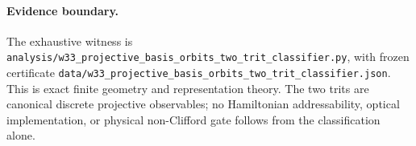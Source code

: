 \paragraph{Evidence boundary.}
The exhaustive witness is
\texttt{analysis/w33\_projective\_basis\_orbits\_two\_trit\_classifier.py}, with
frozen certificate
\texttt{data/w33\_projective\_basis\_orbits\_two\_trit\_classifier.json}.
This is exact finite geometry and representation theory.  The two trits are canonical
discrete projective observables; no Hamiltonian addressability, optical implementation,
or physical non-Clifford gate follows from the classification alone.

